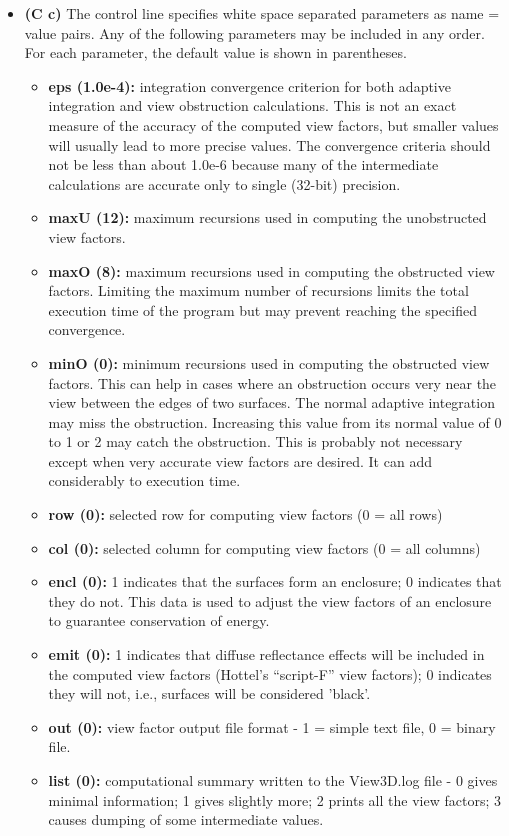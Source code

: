 \documentclass[10pt]{article}
\begin{document}
\begin{itemize}
\item\textbf{(C c)} The control line specifies white space separated parameters
as name = value pairs.  Any of the following parameters may be included in any
order. For each parameter, the default value is shown in parentheses.
\begin{itemize}
\item\textbf{eps (1.0e-4):} integration convergence criterion for both adaptive
integration and view obstruction calculations.  This is not an exact measure of
the accuracy of the computed view factors, but smaller values will usually lead
to more precise values. The convergence criteria should not be less than about
1.0e-6 because many of the intermediate calculations are accurate only to single
(32-bit) precision.
\item\textbf{maxU (12):} maximum recursions used in computing the unobstructed
view factors.
\item\textbf{maxO (8):} maximum recursions used in computing the obstructed
view factors. Limiting the maximum number of recursions limits the total
execution time of the program but may prevent reaching the specified
convergence.
\item\textbf{minO (0):} minimum recursions used in computing the obstructed
view factors. This can help in cases where an obstruction occurs very near the
view between the edges of two surfaces. The normal adaptive integration may
miss the obstruction. Increasing this value from its normal value of 0 to 1 
or 2 may catch the obstruction. This is probably not necessary except when very
accurate view factors are desired. It can add considerably to execution time.
\item\textbf{row (0):} selected row for computing view factors (0 = all rows)
\item\textbf{col (0):} selected column for computing view factors (0 = all
columns)
\item\textbf{encl (0):} 1 indicates that the surfaces form an enclosure; 0
indicates that they do not. This data is used to adjust the view factors of an
enclosure to guarantee conservation of energy.
\item\textbf{emit (0):} 1 indicates that diffuse reflectance effects will be
included in the computed view factors (Hottel’s “script-F” view factors); 0
indicates they will not, i.e., surfaces will be considered 'black'.
\item\textbf{out (0):} view factor output file format - 1 = simple text file, 
0 = binary file.
\item\textbf{list (0):} computational summary written to the View3D.log file - 
0 gives minimal information; 1 gives slightly more; 2 prints all the view
factors; 3 causes dumping of some intermediate values.
\end{itemize}


\end{itemize}
\end{document}
